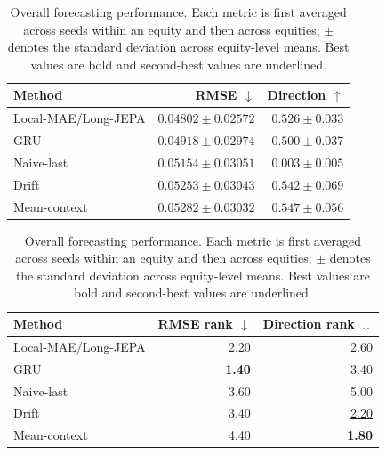 \begin{table}[t]
\centering
\small
\caption{Overall forecasting performance. Each metric is first averaged across seeds within an equity and then across equities; $\pm$ denotes the standard deviation across equity-level means. Best values are bold and second-best values are underlined.}
\label{tab:main_metrics}
\begin{tabular}{lrr}
\toprule
Method & RMSE $\downarrow$ & Direction $\uparrow$ \\
\midrule
Local-MAE/Long-JEPA & \textbf{$0.04802 \pm 0.02572$} & $0.526 \pm 0.033$ \\
GRU & \underline{$0.04918 \pm 0.02974$} & $0.500 \pm 0.037$ \\
Naive-last & $0.05154 \pm 0.03051$ & $0.003 \pm 0.005$ \\
Drift & $0.05253 \pm 0.03043$ & \underline{$0.542 \pm 0.069$} \\
Mean-context & $0.05282 \pm 0.03032$ & \textbf{$0.547 \pm 0.056$} \\
\bottomrule
\end{tabular}
\par\medskip
\begin{tabular}{lrr}
\toprule
Method & RMSE rank $\downarrow$ & Direction rank $\downarrow$ \\
\midrule
Local-MAE/Long-JEPA & \underline{2.20} & 2.60 \\
GRU & \textbf{1.40} & 3.40 \\
Naive-last & 3.60 & 5.00 \\
Drift & 3.40 & \underline{2.20} \\
Mean-context & 4.40 & \textbf{1.80} \\
\bottomrule
\end{tabular}
\end{table}
